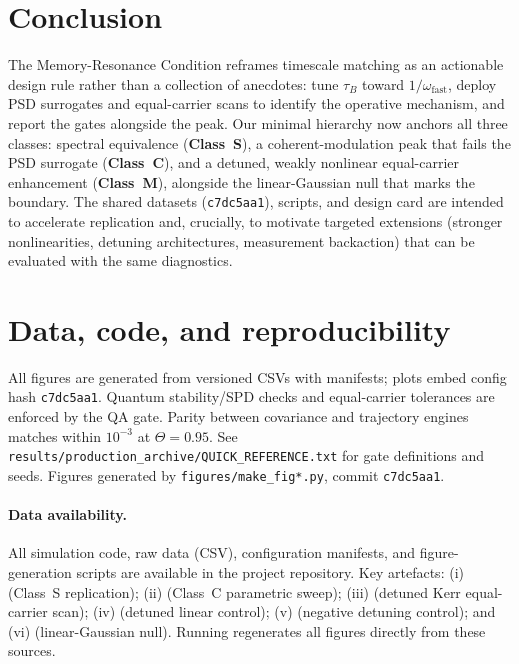 \documentclass[11pt,letterpaper]{article}
\newcommand{\confighash}{c7dc5aa1}
\DeclareRobustCommand{\classS}{\textbf{Class~S}\xspace}
\DeclareRobustCommand{\classC}{\textbf{Class~C}\xspace}
\DeclareRobustCommand{\classM}{\textbf{Class~M}\xspace}
\begin{document}
\section{Conclusion}
The Memory-Resonance Condition reframes timescale matching as an actionable design rule rather than a collection of anecdotes: tune $\tau_B$ toward $1/\omega_{\mathrm{fast}}$, deploy PSD surrogates and equal-carrier scans to identify the operative mechanism, and report the gates alongside the peak. Our minimal hierarchy now anchors all three classes: spectral equivalence (\classS{}), a coherent-modulation peak that fails the PSD surrogate (\classC{}), and a detuned, weakly nonlinear equal-carrier enhancement (\classM{}), alongside the linear-Gaussian null that marks the boundary. The shared datasets (\texttt{\confighash}), scripts, and design card are intended to accelerate replication and, crucially, to motivate targeted extensions (stronger nonlinearities, detuning architectures, measurement backaction) that can be evaluated with the same diagnostics.

\section*{Data, code, and reproducibility}
All figures are generated from versioned CSVs with manifests; plots embed config hash \texttt{\confighash}. Quantum stability/SPD checks and equal-carrier tolerances are enforced by the QA gate. Parity between covariance and trajectory engines matches within $10^{-3}$ at $\Theta=0.95$. See \texttt{results/production\_archive/QUICK\_REFERENCE.txt} for gate definitions and seeds. Figures generated by \texttt{figures/make\_fig*.py}, commit \texttt{\confighash}.

\paragraph*{Data availability.} All simulation code, raw data (CSV), configuration manifests, and figure-generation scripts are available in the project repository. Key artefacts: (i)  (Class~S replication); (ii)  (Class~C parametric sweep); (iii)  (detuned Kerr equal-carrier scan); (iv)  (detuned linear control); (v)  (negative detuning control); and (vi)  (linear-Gaussian null). Running  regenerates all figures directly from these sources.
\end{document}
